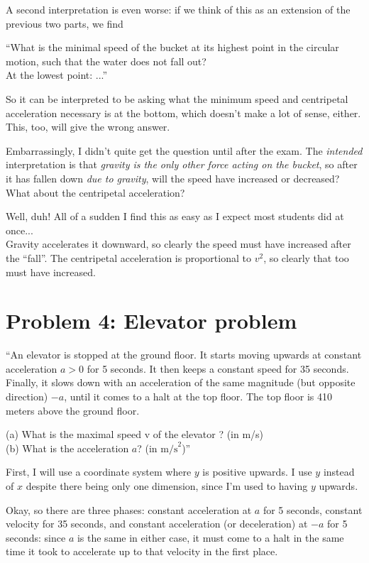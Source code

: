 \documentclass[8.01x]{subfiles}
\begin{document}
A second interpretation is even worse: if we think of this as an extension of the previous two parts, we find

``What is the minimal speed of the bucket at its highest point in the circular motion, such that the water does not fall out?\\
At the lowest point: ...''

So it can be interpreted to be asking what the minimum speed and centripetal acceleration necessary is at the bottom, which doesn't make a lot of sense, either. This, too, will give the wrong answer.

Embarrassingly, I didn't quite get the question until after the exam. The \emph{intended} interpretation is that \emph{gravity is the only other force acting on the bucket}, so after it has fallen down \emph{due to gravity}, will the speed have increased or decreased? What about the centripetal acceleration?

Well, duh! All of a sudden I find this as easy as I expect most students did at once...\\
Gravity accelerates it downward, so clearly the speed must have increased after the ``fall''. The centripetal acceleration is proportional to $v^2$, so clearly that too must have increased.

\section{Problem 4: Elevator problem}

``An elevator is stopped at the ground floor. It starts moving upwards at constant acceleration $a > 0$ for 5 seconds. It then keeps a constant speed for 35 seconds. Finally, it slows down with an acceleration of the same magnitude (but opposite direction) $-a$, until it comes to a halt at the top floor. The top floor is 410 meters above the ground floor.

(a) What is the maximal speed v of the elevator ? (in m/s)\\
(b) What is the acceleration $a$? (in $\text{m/s}^2$)''

First, I will use a coordinate system where $y$ is positive upwards. I use $y$ instead of $x$ despite there being only one dimension, since I'm used to having $y$ upwards.

Okay, so there are three phases: constant acceleration at $a$ for 5 seconds, constant velocity for 35 seconds, and constant acceleration (or deceleration) at $-a$ for 5 seconds: since $a$ is the same in either case, it must come to a halt in the same time it took to accelerate up to that velocity in the first place.
\end{document}
